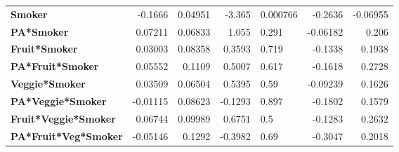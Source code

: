 \documentclass[11pt]{article}
\begin{document}
\begin{table}[h]
\begin{threeparttable}
{\begin{tabular}{lrrrlrr}
\textbf{Smoker} & \raisebox{2ex}{\hypertarget{D7a}{}}-0.1666 & \raisebox{2ex}{\hypertarget{D7b}{}}0.04951 & \raisebox{2ex}{\hypertarget{D7c}{}}-3.365 & \raisebox{2ex}{\hypertarget{D7d}{}}0.000766 & \raisebox{2ex}{\hypertarget{D7e}{}}-0.2636 & \raisebox{2ex}{\hypertarget{D7f}{}}-0.06955 \\
\textbf{PA*Smoker} & \raisebox{2ex}{\hypertarget{D8a}{}}0.07211 & \raisebox{2ex}{\hypertarget{D8b}{}}0.06833 & \raisebox{2ex}{\hypertarget{D8c}{}}1.055 & \raisebox{2ex}{\hypertarget{D8d}{}}0.291 & \raisebox{2ex}{\hypertarget{D8e}{}}-0.06182 & \raisebox{2ex}{\hypertarget{D8f}{}}0.206 \\
\textbf{Fruit*Smoker} & \raisebox{2ex}{\hypertarget{D9a}{}}0.03003 & \raisebox{2ex}{\hypertarget{D9b}{}}0.08358 & \raisebox{2ex}{\hypertarget{D9c}{}}0.3593 & \raisebox{2ex}{\hypertarget{D9d}{}}0.719 & \raisebox{2ex}{\hypertarget{D9e}{}}-0.1338 & \raisebox{2ex}{\hypertarget{D9f}{}}0.1938 \\
\textbf{PA*Fruit*Smoker} & \raisebox{2ex}{\hypertarget{D10a}{}}0.05552 & \raisebox{2ex}{\hypertarget{D10b}{}}0.1109 & \raisebox{2ex}{\hypertarget{D10c}{}}0.5007 & \raisebox{2ex}{\hypertarget{D10d}{}}0.617 & \raisebox{2ex}{\hypertarget{D10e}{}}-0.1618 & \raisebox{2ex}{\hypertarget{D10f}{}}0.2728 \\
\textbf{Veggie*Smoker} & \raisebox{2ex}{\hypertarget{D11a}{}}0.03509 & \raisebox{2ex}{\hypertarget{D11b}{}}0.06504 & \raisebox{2ex}{\hypertarget{D11c}{}}0.5395 & \raisebox{2ex}{\hypertarget{D11d}{}}0.59 & \raisebox{2ex}{\hypertarget{D11e}{}}-0.09239 & \raisebox{2ex}{\hypertarget{D11f}{}}0.1626 \\
\textbf{PA*Veggie*Smoker} & \raisebox{2ex}{\hypertarget{D12a}{}}-0.01115 & \raisebox{2ex}{\hypertarget{D12b}{}}0.08623 & \raisebox{2ex}{\hypertarget{D12c}{}}-0.1293 & \raisebox{2ex}{\hypertarget{D12d}{}}0.897 & \raisebox{2ex}{\hypertarget{D12e}{}}-0.1802 & \raisebox{2ex}{\hypertarget{D12f}{}}0.1579 \\
\textbf{Fruit*Veggie*Smoker} & \raisebox{2ex}{\hypertarget{D13a}{}}0.06744 & \raisebox{2ex}{\hypertarget{D13b}{}}0.09989 & \raisebox{2ex}{\hypertarget{D13c}{}}0.6751 & \raisebox{2ex}{\hypertarget{D13d}{}}0.5 & \raisebox{2ex}{\hypertarget{D13e}{}}-0.1283 & \raisebox{2ex}{\hypertarget{D13f}{}}0.2632 \\
\textbf{PA*Fruit*Veg*Smoker} & \raisebox{2ex}{\hypertarget{D14a}{}}-0.05146 & \raisebox{2ex}{\hypertarget{D14b}{}}0.1292 & \raisebox{2ex}{\hypertarget{D14c}{}}-0.3982 & \raisebox{2ex}{\hypertarget{D14d}{}}0.69 & \raisebox{2ex}{\hypertarget{D14e}{}}-0.3047 & \raisebox{2ex}{\hypertarget{D14f}{}}0.2018 \\

\end{tabular}}
\end{threeparttable}
\end{table}
\end{document}
